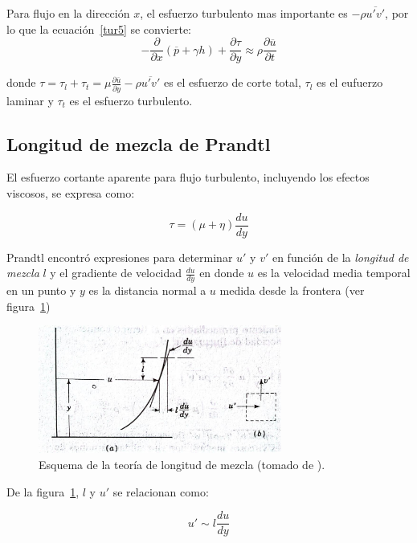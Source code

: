 \documentclass[11pt, oneside]{article}
\begin{document}
Para flujo en la direcci\'on $x$, el esfuerzo turbulento mas importante es $-\rho \overline{u' v'}$, por lo que la ecuaci\'on~\ref{tur5} se convierte:
 \begin{equation}
-\frac{\partial}{\partial x}(\overline{p} + \gamma h) + \frac{\partial \tau}{\partial y} \approx \rho \frac{\partial \overline{u}}{\partial t}
\label{tur6}
\end{equation}

donde $\tau = \tau_l + \tau_t = \mu \frac{\partial \overline{u}}{\partial y} - \rho \overline{u' v'}$ es el esfuerzo de corte total, $\tau_l$ es el eufuerzo laminar y $\tau_t$ es el esfuerzo turbulento. 

\subsection{Longitud de mezcla de Prandtl} %
El esfuerzo cortante aparente para flujo turbulento, incluyendo los efectos viscosos, se expresa como:

\begin{equation}
\tau = (\mu + \eta) \frac{du}{dy}
\label{tur60}
\end{equation}


Prandtl encontr\'o expresiones para determinar $u'$ y $v'$ en funci\'on de la \emph{longitud de mezcla} $l$ y el gradiente de velocidad $\frac{du}{dy}$ en donde $u$ es la velocidad media temporal en un punto y $y$ es la distancia normal a $u$ medida desde la frontera (ver figura~\ref{mez})

\begin{figure}[h]
\centering
\includegraphics[width=8cm]{mez.jpeg}
\caption{Esquema de la teor\'ia de longitud de mezcla (tomado de \cite{streeter}).}
\label{mez}
\end{figure}

De la figura~\ref{mez}, $l$ y $u'$ se relacionan como:

\begin{equation}
u' \sim l \frac{du}{dy}
\label{tur8}
\end{equation}
\end{document}
